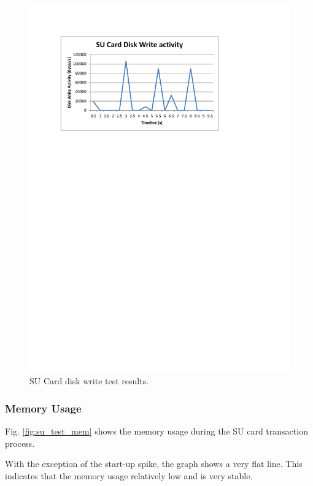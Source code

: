 \begin{figure}
 \centering 
 \includegraphics[clip=true, trim = 0 550 80 70,
 scale=0.7]{su_test_disk}
 \caption{SU Card disk write test results.}
 \label{fig:su_test_disk}
\end{figure}

\subsubsection{Memory Usage}

Fig. \ref{fig:su_test_mem} shows the memory usage during the SU card transaction
process. 

With the exception of the start-up spike, the graph shows a very flat line. This indicates
that the memory usage relatively low and is very stable. 

